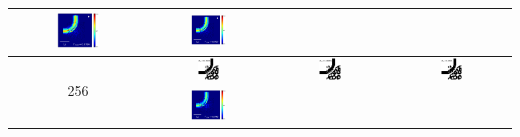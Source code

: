 \begin{table}[ht]
\begin{tabular}{|c|c|c|c|}
      \includegraphics[width=0.33\textwidth]{image/results/bend/PSO/visualize_field_disc_128.png} &
      \includegraphics[width=0.33\textwidth]{image/results/bend/PSO/visualize_field_fab_128.png} \\
    \hline
      \multirow{2}{*}{256} &
      \includegraphics[width=0.20\textwidth]{image/results/bend/PSO/visualize_eps_cont_256.png} &
      \includegraphics[width=0.20\textwidth]{image/results/bend/PSO/visualize_eps_disc_256.png} &
      \includegraphics[width=0.20\textwidth]{image/results/bend/PSO/visualize_eps_fab_256.png} \\
      \cline{2-4}
      &
      \includegraphics[width=0.33\textwidth]{image/results/bend/PSO/visualize_field_cont_256.png} &

\end{tabular}
\end{table}
